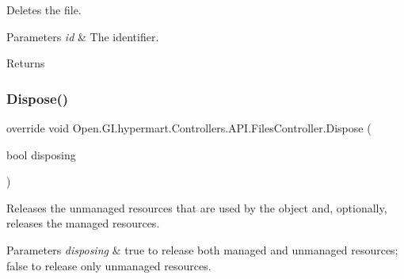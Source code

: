 Deletes the file. 


\begin{DoxyParams}{Parameters}
{\em id} & The identifier.\\
\hline
\end{DoxyParams}
\begin{DoxyReturn}{Returns}

\end{DoxyReturn}
\hypertarget{class_open_1_1_g_i_1_1hypermart_1_1_controllers_1_1_a_p_i_1_1_files_controller_abdd2147a5540d600382f2d1021a6c623}{}\label{class_open_1_1_g_i_1_1hypermart_1_1_controllers_1_1_a_p_i_1_1_files_controller_abdd2147a5540d600382f2d1021a6c623} 
\subsubsection{\texorpdfstring{Dispose()}{Dispose()}}
{\footnotesize\ttfamily override void Open.\+G\+I.\+hypermart.\+Controllers.\+A\+P\+I.\+Files\+Controller.\+Dispose (\begin{DoxyParamCaption}\item[{bool}]{disposing }\end{DoxyParamCaption})\hspace{0.3cm}{\ttfamily [protected]}}



Releases the unmanaged resources that are used by the object and, optionally, releases the managed resources. 


\begin{DoxyParams}{Parameters}
{\em disposing} & true to release both managed and unmanaged resources; false to release only unmanaged resources.\\
\hline
\end{DoxyParams}
\hypertarget{class_open_1_1_g_i_1_1hypermart_1_1_controllers_1_1_a_p_i_1_1_files_controller_ae232956a5cf1b0d749bb27e96154dfd3}{}\label{class_open_1_1_g_i_1_1hypermart_1_1_controllers_1_1_a_p_i_1_1_files_controller_ae232956a5cf1b0d749bb27e96154dfd3} 
